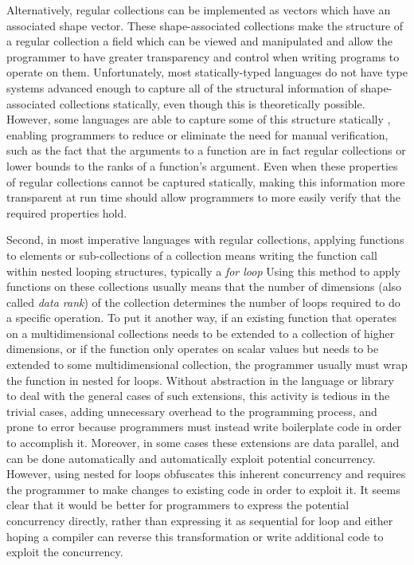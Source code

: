 Alternatively, regular collections can be implemented as vectors which have an associated shape vector. 
These shape-associated collections make the structure of a regular collection 
a field which can be viewed and manipulated and allow the programmer to have 
greater transparency and control when writing programs to operate on them.
Unfortunately, most statically-typed languages do not have type systems advanced enough 
to capture all of the structural information of shape-associated collections statically, 
even though this is theoretically possible. %
However, some languages are able to capture some of this structure statically\cite{boost} \cite{sac} \cite{dph}, 
enabling programmers to reduce or eliminate the need for manual verification, 
such as the fact that the arguments to a function are in fact regular collections or lower bounds to the ranks of a function's argument.
Even when these properties of regular collections cannot be captured statically, 
making this information more transparent at run time 
should allow programmers to more easily verify that the required properties hold.

Second, in most imperative languages with regular collections, 
applying functions to elements or sub-collections of a collection means 
writing the function call within nested looping structures, typically a \textit{for loop}
Using this method to apply functions on these collections usually means that 
the number of dimensions (also called \textit{data rank}) of the collection 
determines the number of loops required to do a specific operation.
To put it another way, if an existing function that operates on a multidimensional collections 
needs to be extended to a collection of higher dimensions, 
or if the function only operates on scalar values but needs to be extended to some multidimensional collection, 
the programmer usually must wrap the function in nested for loops.
Without abstraction in the language or library to deal with the general cases of such extensions, 
this activity is tedious in the trivial cases, adding unnecessary overhead to the programming process,
and prone to error because programmers must instead write boilerplate code in order to accomplish it.
Moreover, in some cases these extensions are data parallel, 
and can be done automatically and automatically exploit potential concurrency.
However, using nested for loops obfuscates this inherent concurrency and 
requires the programmer to make changes to existing code in order to exploit it.
It seems clear that it would be better for programmers to express the potential concurrency directly, 
rather than expressing it as sequential for loop and either hoping a compiler can reverse this transformation 
or write additional code to exploit the concurrency.


